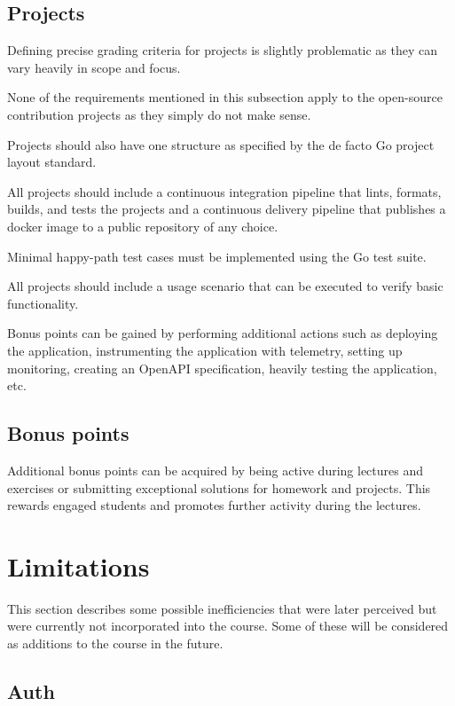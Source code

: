 \documentclass[
  digital,
  color,
  oneside,
  nosansbold,
  nocolorbold,
  lof,
  nolot,
]{fithesis4}
\begin{document}
\subsection{Projects}

Defining precise grading criteria for projects is slightly problematic as they can vary heavily in scope and focus. 

None of the requirements mentioned in this subsection apply to the open-source contribution projects as they simply do not make sense.

Projects should also have one structure as specified by the de facto Go project layout standard\cite{go-project-layout}.

All projects should include a continuous integration pipeline that lints, formats, builds, and tests the projects and a continuous delivery pipeline that publishes a docker image to a public repository of any choice.

Minimal happy-path test cases must be implemented using the Go test suite.

All projects should include a usage scenario that can be executed to verify basic functionality.

Bonus points can be gained by performing additional actions such as deploying the application, instrumenting the application with telemetry, setting up monitoring, creating an OpenAPI specification, heavily testing the application, etc.

\subsection{Bonus points}

Additional bonus points can be acquired by being active during lectures and exercises or submitting exceptional solutions for homework and projects. This rewards engaged students and promotes further activity during the lectures.

\section{Limitations}

This section describes some possible inefficiencies that were later perceived but were currently not incorporated into the course. Some of these will be considered as additions to the course in the future.

\subsection{Auth}
\end{document}
